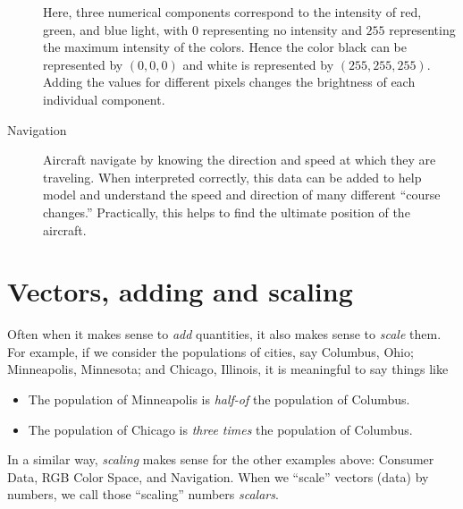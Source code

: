 \documentclass{ximera}
\begin{document}
\begin{concept}
\begin{description}
\begin{center}
  \end{center}
  Here, three numerical components correspond to the intensity of red,
  green, and blue light, with $0$ representing no intensity and $255$
  representing the maximum intensity of the colors. Hence the color
  black can be represented by $(0,0,0)$ and white is represented by
  $(255,255,255)$.  Adding the values for different pixels changes the
  brightness of each individual component.
\item[Navigation] Aircraft navigate by knowing the direction and speed
  at which they are traveling. When interpreted correctly, this data
  can be added to help model and understand the speed and direction of
  many different ``course changes.'' Practically, this helps to find
  the ultimate position of the aircraft.
\end{description}
\end{concept}



\section{Vectors, adding and scaling}


Often when it makes sense to \textit{add} quantities, it also makes
sense to \textit{scale} them. For example, if we consider the
populations of cities, say Columbus, Ohio; Minneapolis, Minnesota; and
Chicago, Illinois, it is meaningful to say things like
\begin{itemize}
\item The population of Minneapolis is \textit{half-of} the population of Columbus.
\item The population of Chicago is \textit{three times} the population of Columbus.
\end{itemize}
In a similar way, \textit{scaling} makes sense for the other examples
above: Consumer Data, RGB Color Space, and Navigation. When
we ``scale'' vectors (data) by numbers, we call those ``scaling'' numbers
\textit{scalars}.
\end{document}
